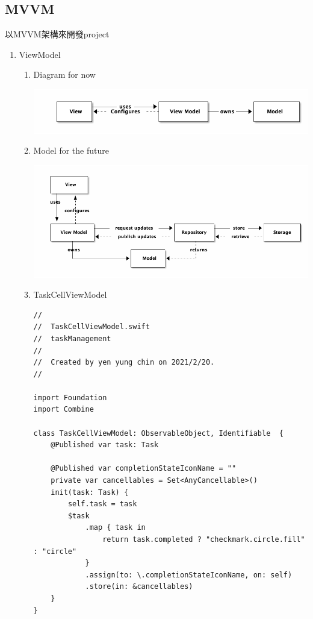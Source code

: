 \documentclass[a4paper,12pt]{article}
\begin{document}
\subsection{MVVM}
\label{sec:org454c953}
以MVVM架構來開發project\\
\begin{enumerate}
\item ViewModel
\label{sec:org38479bb}
\begin{enumerate}
\item Diagram for now
\label{sec:org05c86c8}
\begin{center}
\includegraphics[width=.9\linewidth]{images/mvvm-d1.png}
\end{center}

\item Model for the future
\label{sec:org9759b37}
\begin{center}
\includegraphics[width=.9\linewidth]{images/mvvm-d2.png}
\end{center}

\item TaskCellViewModel
\label{sec:org7a26d83}
\lstset{breaklines=true,language=swift,label= ,caption= ,captionpos=b,firstnumber=1,numbers=left}
\begin{lstlisting}
//
//  TaskCellViewModel.swift
//  taskManagement
//
//  Created by yen yung chin on 2021/2/20.
//

import Foundation
import Combine

class TaskCellViewModel: ObservableObject, Identifiable  {
    @Published var task: Task

    @Published var completionStateIconName = ""
    private var cancellables = Set<AnyCancellable>()
    init(task: Task) {
        self.task = task
        $task
            .map { task in
                return task.completed ? "checkmark.circle.fill" : "circle"
            }
            .assign(to: \.completionStateIconName, on: self)
            .store(in: &cancellables)
    }
}


\end{lstlisting}
\end{enumerate}
\end{enumerate}
\end{document}
